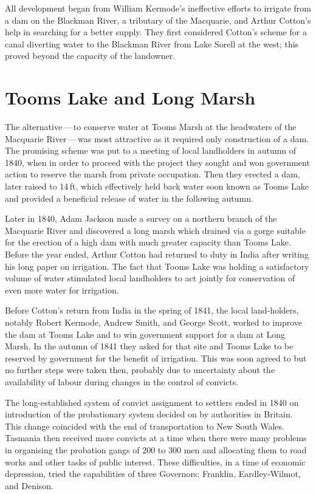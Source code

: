 All development began from William Kermode's
ineffective efforts to irrigate from a dam on the Blackman River, a
tributary of the Macquarie, and Arthur Cotton's help in searching for
a better supply.  They first considered Cotton's scheme for a canal
diverting water to the Blackman River from Lake
Sorell at the west; this proved beyond the capacity
of the landowner.

\section*{Tooms Lake and Long Marsh}

The alternative\,---\,to conserve water at Tooms Marsh at the
headwaters of the Macquarie River\,---\,was
most attractive as it required only construction of a dam.  The
promising scheme was put to a meeting of local landholders in autumn
of 1840, when in order to proceed with the project they sought and won
government action to reserve the marsh from private occupation.  Then
they erected a dam, later raised to 14\,ft, which effectively held
back water soon known as Tooms Lake and provided a beneficial release
of water in the following autumn.

Later in 1840, Adam Jackson made a survey on a northern branch of the
Macquarie River and discovered a long marsh which drained via a gorge
suitable for the erection of a high dam with much greater capacity
than Tooms Lake.  Before the year ended, Arthur Cotton had returned to
duty in India after writing his long paper on irrigation.  The fact
that Tooms Lake was holding a satisfactory volume of water stimulated
local landholders to act jointly for conservation of even more water
for irrigation.

Before Cotton's return from India in the spring of 1841, the local
land-holders, notably Robert Kermode, Andrew Smith, and George Scott,
worked to improve the dam at Tooms Lake and to win government support
for a dam at Long Marsh.  In the autumn of 1841 they asked for that
site and Tooms Lake to be reserved by government for the benefit of
irrigation.  This was soon agreed to but no further steps were taken
then, probably due to uncertainty about the availability of labour
during changes in the control of convicts.

The long-established system of convict assignment to settlers ended in
1840 on introduction of the probationary system decided on by
authorities in Britain.  This change coincided with the end of
transportation to New South Wales.  Tasmania then received more
convicts at a time when there were many problems in organising the
probation gangs of 200 to 300 men and allocating them to road works
and other tasks of public interest.  These difficulties, in a time of
economic depression, tried the capabilities of three Governors:
Franklin, Eardley-Wilmot, and Denison.

